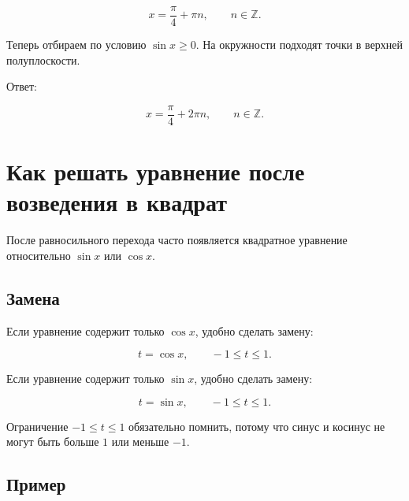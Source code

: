 \documentclass[a4paper,12pt]{article}
\newcommand{\Z}{\mathbb{Z}}
\begin{document}
\[
x=\frac{\pi}{4}+\pi n,\qquad n\in\Z.
\]

Теперь отбираем по условию \(\sin x\ge0\). На окружности подходят точки в верхней полуплоскости.

\begin{center}
\end{center}

Ответ:

\[
x=\frac{\pi}{4}+2\pi n,\qquad n\in\Z.
\]

\section{Как решать уравнение после возведения в квадрат}

После равносильного перехода часто появляется квадратное уравнение относительно \(\sin x\) или \(\cos x\).

\subsection{Замена}

Если уравнение содержит только \(\cos x\), удобно сделать замену:

\[
t=\cos x,\qquad -1\le t\le1.
\]

Если уравнение содержит только \(\sin x\), удобно сделать замену:

\[
t=\sin x,\qquad -1\le t\le1.
\]

Ограничение \(-1\le t\le1\) обязательно помнить, потому что синус и косинус не могут быть больше \(1\) или меньше \(-1\).

\subsection{Пример}
\end{document}

